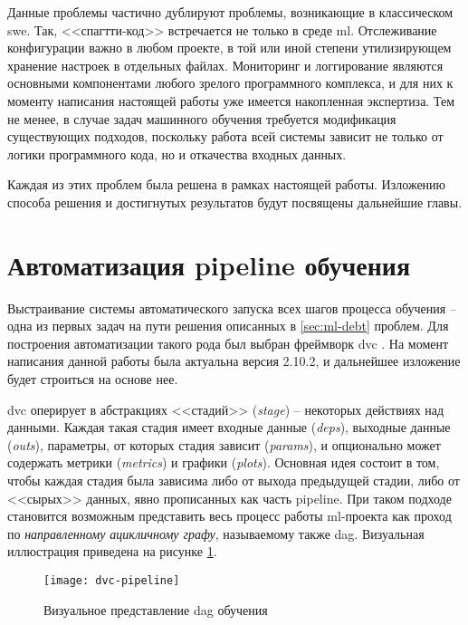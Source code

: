 Данные проблемы частично дублируют проблемы, возникающие в классическом \gls{swe}.
Так, <<спагтти-код>> встречается не только в среде \acrshort{ml}.
Отслеживание конфигурации важно в любом проекте, в той или иной степени утилизирующем хранение настроек в отдельных файлах.
Мониторинг и логгирование являются основными компонентами любого зрелого программного комплекса, и для них к моменту написания настоящей работы уже имеется накопленная экспертиза.
Тем не менее, в случае задач машинного обучения требуется модификация существующих подходов, поскольку работа всей системы зависит не только от логики программного кода, но и откачества входных данных.

Каждая из этих проблем была решена в рамках настоящей работы.
Изложению способа решения и достигнутых результатов будут посвящены дальнейшие главы.
\section{Автоматизация \gls{pipeline} обучения}
\label{sec:dvc-pipeline}
Выстраивание системы автоматического запуска всех шагов процесса обучения -- одна из первых задач на пути решения описанных в \ref{sec:ml-debt} проблем.
Для построения автоматизации такого рода был выбран фреймворк \gls{dvc} \cite{cite:dvc}.
На момент написания данной работы была актуальна версия 2.10.2, и дальнейшее изложение будет строиться на основе нее.

\Gls{dvc} оперирует в абстракциях <<стадий>> (\textit{stage}) -- некоторых действиях над данными.
Каждая такая стадия имеет входные данные (\textit{deps}), выходные данные (\textit{outs}), параметры, от которых стадия зависит (\textit{params}), и опционально может содержать метрики (\textit{metrics}) и графики (\textit{plots}).
Основная идея состоит в том, чтобы каждая стадия была зависима либо от выхода предыдущей стадии, либо от <<сырых>> данных, явно прописанных как часть \gls{pipeline}.
При таком подходе становится возможным представить весь процесс работы \acrshort{ml}-проекта как проход по \textit{направленному ацикличному графу}, называемому также \acrfull{dag}.
Визуальная иллюстрация приведена на рисунке \ref{fig:dvc-pipeline}.

\begin{figure}[!h]
    \centering
    \texttt{[image: dvc-pipeline]}
    \caption{Визуальное представление \acrshort{dag} обучения}
    \label{fig:dvc-pipeline}
\end{figure}

